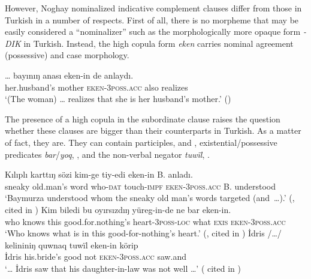\documentclass[output=paper]{langsci/langscibook}
\begin{document}
\begin{sloppypar}
However, Noghay nominalized indicative complement clauses differ from those in Turkish in a number of respects. 
First of all, there is no morpheme that may be easily considered a ``nominalizer'' such as the morphologically more opaque form \textit{-DIK} in Turkish. 
Instead, the high copula form \textit{eken} carries nominal agreement (possessive) and case morphology. 
\end{sloppypar}

\ea %
    \label{kelepirex:key:17}
    \gll \ldots{} bayınıŋ anası eken-in de anlaydı. \\
    {} her.husband's mother \textsc{eken}-3\textsc{poss}.\textsc{acc} also realizes \\
    \glt `(The woman) \ldots{} realizes that she is her husband's mother.' (\citealp[343]{Karakoc2007})
\z 

The presence of a high copula in the subordinate clause raises the question whether these clauses are bigger than their counterparts in Turkish. 
As a matter of fact, they are. 
They can contain participles,  and , existential/possessive predicates \textit{bar}/\textit{yoq}, , and the non-verbal negator \textit{tuwïl}, . 

\ea %
    \label{kelepirex:key:18}
    \gll Kılıplı karttıŋ sözi kim-ge tiy-edi eken-in B. anladı. \\
    sneaky old.man's word who-\textsc{dat} touch-\textsc{impf} \textsc{eken}-\textsc{3poss.acc} B. understood \\
    \glt `Baymurza understood whom the sneaky old man's words targeted (and~\ldots{}).' (\citealp[126]{DjanbidaevaOgurlieva1995}, cited in \citealp[353]{Karakoc2007})
\ex %
    \label{kelepirex:key:19}
    \gll Kim biledi bu oyırsızdıŋ yüreg-in-de ne bar eken-in.\\
    who knows this good.for.nothing's heart-\textsc{3poss}-\textsc{loc} what \textsc{exis} \textsc{eken}-\textsc{3poss}.\textsc{acc} \\
    \glt `Who knows what is in this good-for-nothing's heart.' (\citealp[55]{DjanbidaevaOgurlieva1995}, cited in \citealp[344]{Karakoc2007})
\ex %
    \label{kelepirex:key:20}
    \gll İdris /\ldots{}/ kelininiŋ  quwnaq tuwïl eken-in körip \\
    İdris  {}   his.bride's  good      not   \textsc{eken}-\textsc{3poss}.\textsc{acc} saw.and \\
    \glt `\ldots{} İdris saw that his daughter-in-law was not well \ldots{}' (\citealp[159]{Kapaev1962} cited in \citealp[33]{Karakoc2001})
\z
\end{document}
